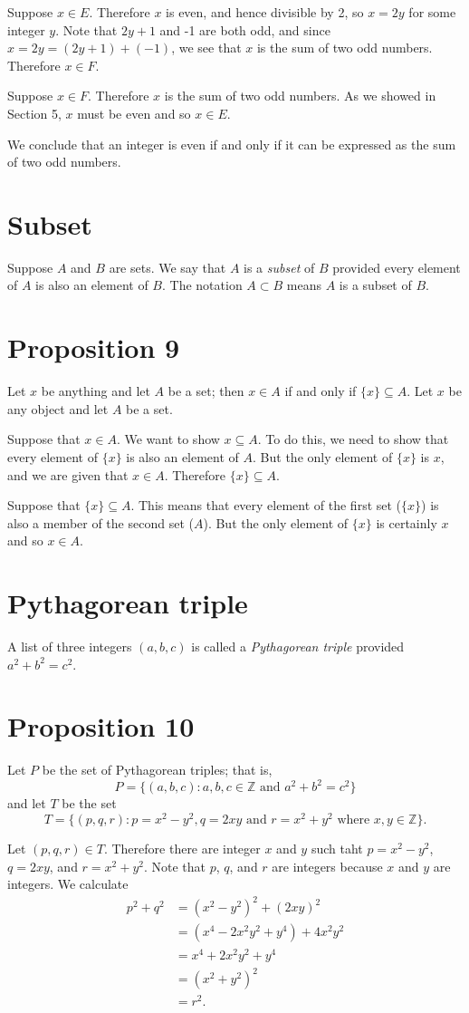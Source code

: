 \documentclass[12pt]{article}
\begin{document}
Suppose $x\in E$. Therefore $x$ is even, and hence divisible by 2, so $x=2y$ for some integer $y$. Note that $2y+1$ and -1 are both odd, and since $x=2y=(2y+1)+(-1)$, we see that $x$ is the sum of two odd numbers. Therefore $x\in F$.

Suppose $x\in F.$ Therefore $x$ is the sum of two odd numbers. As we showed in Section 5, $x$ must be even and so $x\in E$. 

We conclude that an integer is even if and only if it can be expressed as the sum of two odd numbers.
\section*{Subset}
Suppose $A$ and $B$ are sets. We say that $A$ is a \textit{subset} of $B$ provided every element of $A$ is also an element of $B$. The notation $A\subset B$ means $A$ is a subset of $B$.
\section*{Proposition 9}
Let $x$ be anything and let $A$ be a set; then $x\in A$ if and only if $\{x\}\subseteq A$. 
Let $x$ be any object and let $A$ be a set.

Suppose that $x\in A$. We want to show ${x}\subseteq A$. To do this, we need to show that every element of $\{x\}$ is also an element of $A$. But the only element of $\{x\}$ is $x$, and we are given that $x\in A$. Therefore $\{x\}\subseteq A$.

Suppose that $\{x\}\subseteq A$. This means that every element of the first set ($\{x\}$) is also a member of the second set ($A$). But the only element of $\{x\}$ is certainly $x$ and so $x\in A$.
\section*{Pythagorean triple}
A list of three integers $(a,b,c)$ is called a \textit{Pythagorean triple} provided $a^2+b^2=c^2$.
\section*{Proposition 10}
Let $P$ be the set of Pythagorean triples; that is,
\[P=\{(a,b,c):a,b,c\in\mathbb{Z}\text{ and }a^2+b^2=c^2\}\]
and let $T$ be the set
\[T=\{(p,q,r):p=x^2-y^2,q=2xy\text{ and }r=x^2+y^2\text{ where }x,y\in\mathbb{Z}\}.\]

Let $(p,q,r)\in T$. Therefore there are integer $x$ and $y$ such taht $p=x^2-y^2$, $q=2xy$, and $r=x^2+y^2$. Note that $p$, $q$, and $r$ are integers because $x$ and $y$ are integers. We calculate
\begin{align*}
p^2+q^2
&=(x^2-y^2)^2+(2xy)^2\\
&=(x^4-2x^2y^2+y^4)+4x^2y^2\\
&=x^4+2x^2y^2+y^4\\
&=(x^2+y^2)^2\\
&=r^2.
\end{align*}
\end{document}
